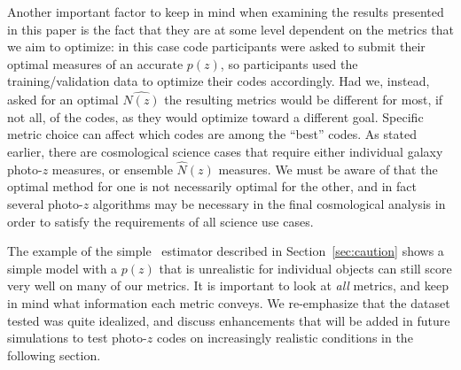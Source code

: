 Another important factor to keep in mind when examining the results presented in this paper is the fact that they are at some level dependent on the metrics that we aim to optimize: in this case code participants were asked to submit their optimal measures of an accurate $p(z)$, so participants used the training/validation data to optimize their codes accordingly.  Had we, instead, asked for an optimal $\hat{N(z)}$ the resulting metrics would be different for most, if not all, of the codes, as they would optimize toward a different goal.  Specific metric choice can affect which codes are among the ``best'' codes.  As stated earlier, there are cosmological science cases that require either individual galaxy photo-$z$ measures, or ensemble $\hat{N}(z)$ measures.  We must be aware of that the optimal method for one is not necessarily optimal for the other, and in fact several photo-$z$ algorithms may be necessary in the final cosmological analysis in order to satisfy the requirements of all science use cases.

The example of the simple \trainz\ estimator described in Section~\ref{sec:caution} shows a simple model with a $p(z)$ that is unrealistic for individual objects can still score very well on many of our metrics.  It is important to look at {\it all} metrics, and keep in mind what information each metric conveys.
We re-emphasize that the dataset tested was quite idealized, and discuss enhancements that will be added in future simulations to test photo-$z$ codes on increasingly realistic conditions in the following section.

